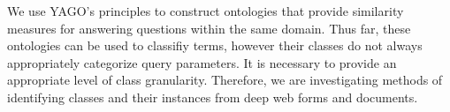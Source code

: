 We use YAGO's principles to construct ontologies that provide similarity measures for answering questions within the same domain.  Thus far, these ontologies can be used to classifiy terms, however their classes do not always appropriately categorize query parameters.  It is necessary to provide an appropriate level of class granularity.  Therefore, we are investigating  methods of identifying classes and their instances from deep web forms and documents.


